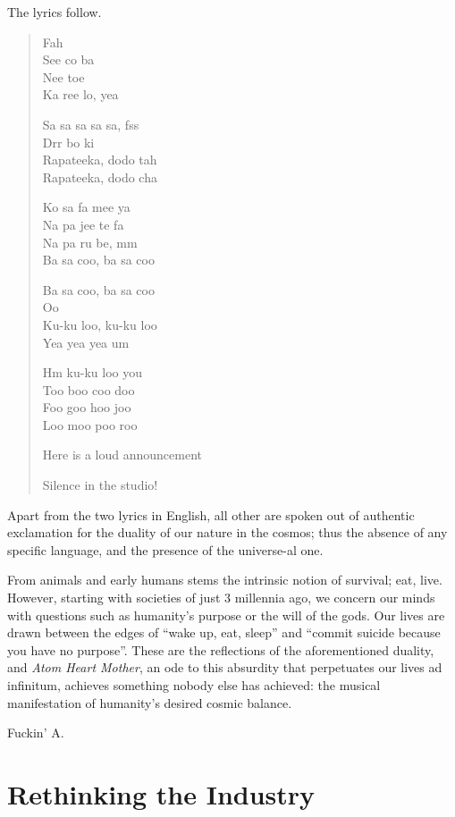 The lyrics follow.

\begin{quote}
    Fah\\
    See co ba\\
    Nee toe\\
    Ka ree lo, yea

    Sa sa sa sa sa, fss\\
    Drr bo ki\\
    Rapateeka, dodo tah\\
    Rapateeka, dodo cha

    Ko sa fa mee ya\\
    Na pa jee te fa\\
    Na pa ru be, mm\\
    Ba sa coo, ba sa coo

    Ba sa coo, ba sa coo\\
    Oo\\
    Ku-ku loo, ku-ku loo\\
    Yea yea yea um

    Hm ku-ku loo you\\
    Too boo coo doo\\
    Foo goo hoo joo\\
    Loo moo poo roo

    Here is a loud announcement

    Silence in the studio!
\end{quote}

Apart from the two lyrics in English, all other are spoken out of authentic exclamation for the duality of our nature in the cosmos; thus the absence of any specific language, and the presence of the universe-al one.

From animals and early humans stems the intrinsic notion of survival; eat, live. However, starting with societies of just 3 millennia ago, we concern our minds with questions such as humanity’s purpose or the will of the gods. Our lives are drawn between the edges of “wake up, eat, sleep” and “commit suicide because you have no purpose”. These are the reflections of the aforementioned duality, and \emph{Atom Heart Mother}, an ode to this absurdity that perpetuates our lives ad infinitum, achieves something nobody else has achieved: the musical manifestation of humanity’s desired cosmic balance.

Fuckin’ A.

\chapter{Rethinking the Industry}

